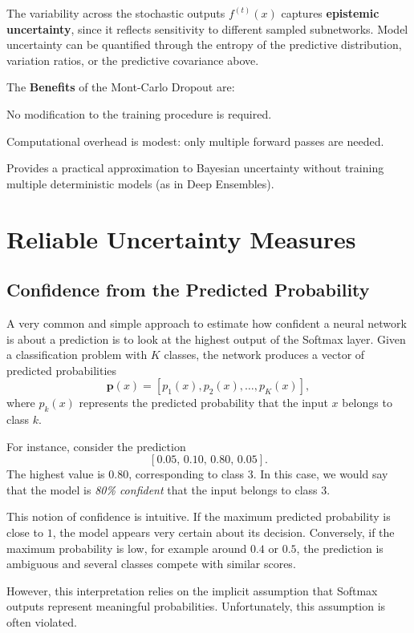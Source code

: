The variability across the stochastic outputs $f^{(t)}(x)$ captures \textbf{epistemic uncertainty}, since it reflects sensitivity to different sampled subnetworks. Model uncertainty can be quantified through the entropy of the predictive distribution, variation ratios, or the predictive covariance above.

The \textbf{Benefits} of the Mont-Carlo Dropout are:
\begin{compactitemize}
    \item No modification to the training procedure is required.
    \item Computational overhead is modest: only multiple forward passes are needed.
    \item Provides a practical approximation to Bayesian uncertainty without training multiple deterministic models (as in Deep Ensembles).
\end{compactitemize}

\section{Reliable Uncertainty Measures}

\subsection{Confidence from the Predicted Probability}

A very common and simple approach to estimate how confident a neural network is about a prediction is to look at the highest output of the Softmax layer.
Given a classification problem with $K$ classes, the network produces a vector of predicted probabilities
\[
\mathbf{p}(x) = [p_1(x), p_2(x), \dots, p_K(x)],
\]
where $p_k(x)$ represents the predicted probability that the input $x$ belongs to class $k$.

For instance, consider the prediction
\[
[0.05,\, 0.10,\, 0.80,\, 0.05].
\]
The highest value is $0.80$, corresponding to class 3. In this case, we would say that the model is \emph{80\% confident} that the input belongs to class 3.

This notion of confidence is intuitive. If the maximum predicted probability is close to $1$, the model appears very certain about its decision. Conversely, if the maximum probability is low, for example around $0.4$ or $0.5$, the prediction is ambiguous and several classes compete with similar scores.

However, this interpretation relies on the implicit assumption that Softmax outputs represent meaningful probabilities. Unfortunately, this assumption is often violated.

